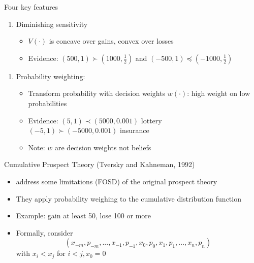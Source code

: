 \begin{frame}{Four key features}
    \begin{enumerate}[3.]
        \item Diminishing sensitivity\medskip
            \begin{itemize}
                \item $V(\cdot)$ is concave over gains, convex over losses\medskip
                \item Evidence: $(500,1) \succ (1000,\frac{1}{2})$ and
                \qquad  $(-500,1) \preceq  (-1000,\frac{1}{2})$
            \end{itemize}
            \bigskip
    \end{enumerate}
    \begin{enumerate}[4.]
        \item Probability weighting:\medskip
            \begin{itemize}
                \item Transform probability with decision weights $w(\cdot)$:
                high weight on low probabilities\medskip
                \item Evidence: $(5,1)\prec (5000,0.001)$ lottery\\
                \qquad  $(-5,1)\succ (-5000,0.001)$ insurance\medskip
            \item Note: $w$ are decision weights not beliefs
        \end{itemize}

    \end{enumerate}
\end{frame}




\begin{frame}{Cumulative Prospect Theory (Tversky and Kahneman, 1992)}
    \begin{itemize}
        \item \citet{TverskyKahneman1992} address some limitations (FOSD) of the original \citet{KahnemanTversky1979} prospect theory \bigskip
        \item They apply probability weighing to the cumulative distribution function\bigskip
        \item Example: gain at least 50, lose 100 or more\bigskip
        \item Formally, consider
        \[(x_{-m},p_{-m},...,x_{-1},p_{-1},x_0,p_0,x_1,p_1,...,x_n,p_n)\]
        with $x_i < x_j$ for $i<j,x_0=0$\bigskip
         \end{itemize}
\end{frame}

